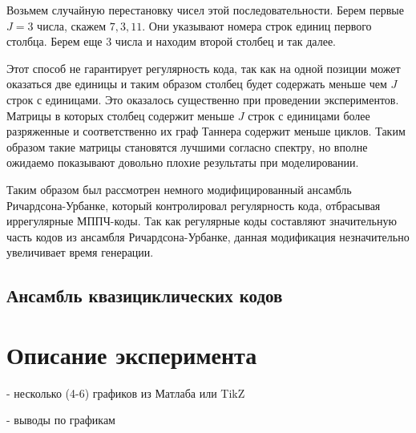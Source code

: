 Возьмем случайную перестановку чисел этой последовательности.
Берем первые $J=3$ числа, скажем $7,3,11$. Они указывают номера строк единиц
первого столбца. Берем еще 3 числа и находим второй столбец и так далее.

Этот способ не гарантирует регулярность кода, так как на одной позиции может оказаться две единицы
и таким образом столбец будет содержать меньше чем $J$ строк с единицами. Это оказалось существенно при
проведении экспериментов. Матрицы в которых столбец содержит меньше $J$ строк с единицами
более разряженные и соответственно их граф Таннера содержит меньше циклов. Таким образом такие матрицы
становятся лучшими согласно спектру, но вполне ожидаемо показывают довольно плохие результаты при моделировании.

Таким образом был рассмотрен немного модифицированный ансамбль Ричардсона-Урбанке, который контролировал
регулярность кода, отбрасывая иррегулярные МППЧ-коды. Так как регулярные коды составляют значительную
часть кодов из ансамбля Ричардсона-Урбанке, данная модификация незначительно увеличивает время генерации.
\subsection{Ансамбль квазициклических кодов}

\section{Описание эксперимента}

- несколько (4-6) графиков из Матлаба или  TikZ

- выводы по графикам
